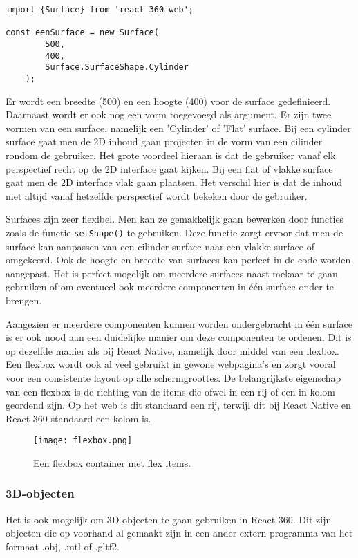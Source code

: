 \begin{lstlisting}[frame=single, caption=Voorbeeld van een surface]
import {Surface} from 'react-360-web';

const eenSurface = new Surface(
		500,
		400,
		Surface.SurfaceShape.Cylinder
	);
\end{lstlisting}

Er wordt een breedte (500) en een hoogte (400) voor de surface gedefinieerd. Daarnaast wordt er ook nog een vorm toegevoegd als argument. Er zijn twee vormen van een surface, namelijk een 'Cylinder' of 'Flat' surface. Bij een cylinder surface gaat men de 2D inhoud gaan projecten in de vorm van een cilinder rondom de gebruiker. Het grote voordeel hieraan is dat de gebruiker vanaf elk perspectief recht op de 2D interface gaat kijken. Bij een flat of vlakke surface gaat men de 2D interface vlak gaan plaatsen. Het verschil hier is dat de inhoud niet altijd vanaf hetzelfde perspectief wordt bekeken door de gebruiker.

Surfaces zijn zeer flexibel. Men kan ze gemakkelijk gaan bewerken door functies zoals de functie \lstinline[basicstyle=\ttfamily\color{red}]|setShape()| te gebruiken. Deze functie zorgt ervoor dat men de surface kan aanpassen van een cilinder surface naar een vlakke surface of omgekeerd. Ook de hoogte en breedte van surfaces kan perfect in de code worden aangepast. Het is perfect mogelijk om meerdere surfaces naast mekaar te gaan gebruiken of om eventueel ook meerdere componenten in één surface onder te brengen. 

Aangezien er meerdere componenten kunnen worden ondergebracht in één surface is er ook nood aan een duidelijke manier om deze componenten te ordenen. Dit is op dezelfde manier als bij React Native, namelijk door middel van een flexbox. Een flexbox wordt ook al veel gebruikt in gewone webpagina's en zorgt vooral voor een consistente layout op alle schermgroottes. De belangrijkste eigenschap van een flexbox is de richting van de items die ofwel in een rij of een in kolom geordend zijn. Op het web is dit standaard een rij, terwijl dit bij React Native en React 360 standaard een kolom is.

\begin{figure}[h]
	\centering
	\texttt{[image: flexbox.png]}
	\caption{Een flexbox container met flex items.}
	\label{fig:flexbox}
\end{figure}

\subsubsection{3D-objecten}
\label{ssubsec:3d-objecten}
Het is ook mogelijk om 3D objecten te gaan gebruiken in React 360. Dit zijn objecten die op voorhand al gemaakt zijn in een ander extern programma van het formaat .obj, .mtl of .gltf2.

